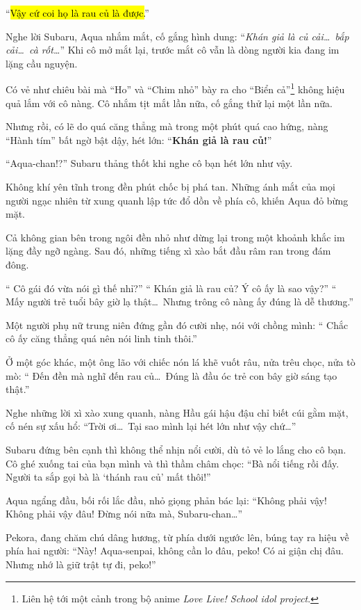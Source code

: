 \documentclass[../main.tex]{subfiles}
\begin{document}
``\hl{Vậy cứ coi họ là rau củ là được.}''

Nghe lời Subaru, Aqua nhắm mắt, cố gắng hình dung: ``\textit{Khán giả là củ cải\dots\ bắp cải\dots\ cà rốt\dots}'' Khi cô mở mắt lại, trước mắt cô vẫn là dòng người kia đang im lặng cầu nguyện.

Có vẻ như chiêu bài mà ``Ho'' và ``Chim nhỏ'' bày ra cho ``Biển cả''\footnote{Liên hệ tới một cảnh trong bộ anime \textit{Love Live! School idol project}.} không hiệu quả lắm với cô nàng. Cô nhắm tịt mắt lần nữa, cố gắng thử lại một lần nữa.

Nhưng rồi, có lẽ do quá căng thẳng mà trong một phút quá cao hứng, nàng ``Hành tím'' bất ngờ bật dậy, hét lớn: ``\textbf{\color{red}Khán giả là rau củ!}''

``Aqua-chan!?'' Subaru thảng thốt khi nghe cô bạn hét lớn như vậy.

Không khí yên tĩnh trong đền phút chốc bị phá tan. Những ánh mắt của mọi người ngạc nhiên từ xung quanh lập tức đổ dồn về phía cô, khiến Aqua đỏ bừng mặt.

Cả không gian bên trong ngôi đền nhỏ như dừng lại trong một khoảnh khắc im lặng đầy ngỡ ngàng. Sau đó, những tiếng xì xào bắt đầu râm ran trong đám đông.

``{\color{red} Cô gái đó vừa nói gì thế nhỉ?}'' ``{\color{red} Khán giả là rau củ? Ý cô ấy là sao vậy?}'' ``{\color{red} Mấy người trẻ tuổi bây giờ lạ thật\dots\ Nhưng trông cô nàng ấy đúng là dễ thương.}''

Một người phụ nữ trung niên đứng gần đó cười nhẹ, nói với chồng mình: ``{\color{red} Chắc cô ấy căng thẳng quá nên nói linh tinh thôi.}''

Ở một góc khác, một ông lão với chiếc nón lá khẽ vuốt râu, nửa trêu chọc, nửa tò mò: ``{\color{red} Đến đền mà nghĩ đến rau củ\dots\ Đúng là đầu óc trẻ con bây giờ sáng tạo thật.}''

Nghe những lời xì xào xung quanh, nàng Hầu gái hậu đậu chỉ biết cúi gằm mặt, cố nén sự xấu hổ: ``Trời ơi\dots\ Tại sao mình lại hét lớn như vậy chứ\dots''

Subaru đứng bên cạnh thì không thể nhịn nổi cười, dù tỏ vẻ lo lắng cho cô bạn. Cô ghé xuống tai của bạn mình và thì thầm châm chọc: ``Bà nổi tiếng rồi đấy. Người ta sắp gọi bà là `thánh rau củ' mất thôi!''

Aqua ngẩng đầu, bối rối lắc đầu, nhỏ giọng phản bác lại: ``Không phải vậy! Không phải vậy đâu! Đừng nói nữa mà, Subaru-chan\dots''

Pekora, đang chăm chú dâng hương, từ phía dưới ngước lên, búng tay ra hiệu về phía hai người: ``Này! Aqua-senpai, không cần lo đâu, peko! Có ai giận chị đâu. Nhưng nhớ là giữ trật tự đi, peko!''
\end{document}
